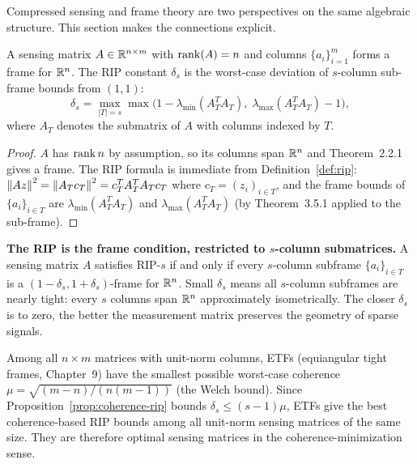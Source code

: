 Compressed sensing and frame theory are two perspectives on the same
algebraic structure. This section makes the connections explicit.

\begin{proposition}
\label{prop:sensing-frame}
A sensing matrix $A\in\mathbb{R}^{n\times m}$ with $\operatorname{rank}(A)=n$ and columns
$\{a_i\}_{i=1}^m$ forms a frame for $\mathbb{R}^n$. The RIP constant $\delta_s$
is the worst-case deviation of $s$-column sub-frame bounds from $(1,1)$:
\[
  \delta_s = \max_{|T|=s}\max\!\bigl(1-\lambda_{\min}(A_T^TA_T),\;
  \lambda_{\max}(A_T^TA_T)-1\bigr),
\]
where $A_T$ denotes the submatrix of $A$ with columns indexed by $T$.
\end{proposition}

\begin{proof}
$A$ has $\operatorname{rank} n$ by assumption, so its columns span $\mathbb{R}^n$ and
Theorem~2.2.1 gives a frame. The RIP formula is immediate from
Definition~\ref{def:rip}: $\left\| Az \right\|^2 = \left\| A_Tc_T \right\|^2 = c_T^T A_T^T
A_T c_T$ where $c_T=(z_i)_{i\in T}$, and the frame bounds of
$\{a_i\}_{i\in T}$ are $\lambda_{\min}(A_T^TA_T)$ and
$\lambda_{\max}(A_T^TA_T)$ (by Theorem~3.5.1 applied to the sub-frame).
\end{proof}

\begin{keyidea}
\textbf{The RIP is the frame condition, restricted to $s$-column
submatrices.} A sensing matrix $A$ satisfies RIP-$s$ if and only if
every $s$-column subframe $\{a_i\}_{i\in T}$ is a
$(1-\delta_s,1+\delta_s)$-frame for $\mathbb{R}^n$. Small $\delta_s$ means
all $s$-column subframes are nearly tight: every $s$ columns span
$\mathbb{R}^n$ approximately isometrically. The closer $\delta_s$ is to zero,
the better the measurement matrix preserves the geometry of sparse
signals.
\end{keyidea}

\begin{proposition}
\label{prop:etf-optimal-sensing}
Among all $n\times m$ matrices with unit-norm columns, ETFs (equiangular
tight frames, Chapter~9) have the smallest possible worst-case coherence
$\mu = \sqrt{(m-n)/(n(m-1))}$ (the Welch bound). Since
Proposition~\ref{prop:coherence-rip} bounds $\delta_s\le(s-1)\mu$, ETFs
give the best coherence-based RIP bounds among all unit-norm sensing
matrices of the same size. They are therefore optimal sensing matrices
in the coherence-minimization sense.
\end{proposition}

